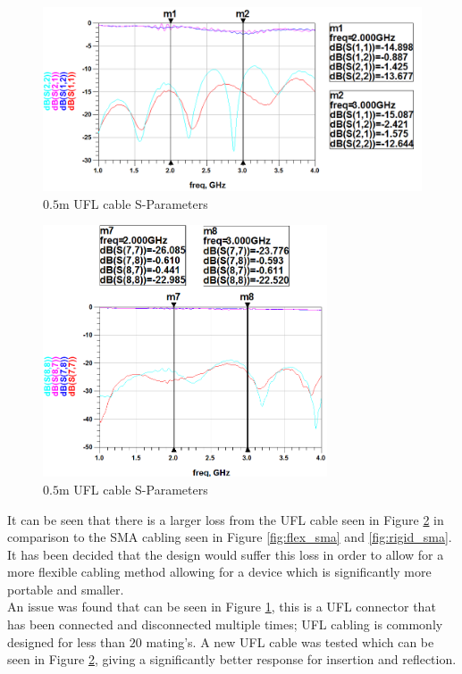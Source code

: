 \documentclass[12pt,openany,a4paper]{book}
\begin{document}
\begin{figure}[H]
	\centering
	\includegraphics[width=1\textwidth]{UFL-res.png}
	\caption{$0.5$m UFL cable S-Parameters}
	\label{fig:ufl_sma-bad}
\end{figure} 
\begin{figure}[H]
	\centering
	\includegraphics[width=0.75\textwidth]{UFL-short-res.png}
	\caption{$0.5$m UFL cable S-Parameters}
	\label{fig:ufl_sma}
\end{figure} 
It can be seen that there is a larger loss from the UFL cable seen in Figure \ref{fig:ufl_sma} in comparison to the SMA cabling seen in Figure \ref{fig:flex_sma} and \ref{fig:rigid_sma}. It has been decided that the design would suffer this loss in order to allow for a more flexible cabling method allowing for a device which is significantly more portable and smaller. \\
An issue was found that can be seen in Figure \ref{fig:ufl_sma-bad}, this is a UFL connector that has been connected and disconnected multiple times; UFL cabling is commonly designed for less than $20$ mating's. A new UFL cable was tested which can be seen in Figure \ref{fig:ufl_sma}, giving a significantly better response for insertion and reflection.
\end{document}
